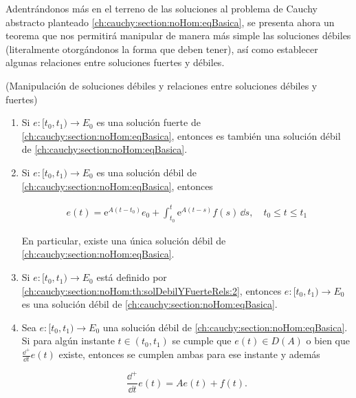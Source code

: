 Adentrándonos más en el terreno de las soluciones al problema de Cauchy abstracto planteado \eqref{ch:cauchy:section:noHom:eqBasica}, se presenta ahora un teorema que nos permitirá manipular de manera más simple las soluciones débiles (literalmente otorgándonos la forma que deben tener), así como establecer algunas relaciones entre soluciones fuertes y débiles.\\

\begin{Teorema}{(Manipulación de soluciones débiles y relaciones entre soluciones débiles y fuertes)}
    \label{ch:cauchy:section:noHom:th:solDebilYFuerteRels}

    \begin{enumerate}
        \item Si $e : [t_0, t_1) \rightarrow E_0$ es una solución fuerte de \eqref{ch:cauchy:section:noHom:eqBasica}, entonces es también una solución débil de \eqref{ch:cauchy:section:noHom:eqBasica}.

        \item Si $e : [t_0, t_1) \rightarrow E_0$ es una solución débil de \eqref{ch:cauchy:section:noHom:eqBasica}, entonces

        \begin{align}
            \label{ch:cauchy:section:noHom:th:solDebilYFuerteRels:2}
            e(t) = \mathrm{e}^{A(t-t_0)}e_0 + \int_{t_0}^{t}\mathrm{e}^{A(t-s)}f(s) \, \dd s, \quad t_0 \leq t \leq t_1
        \end{align}

        En particular, existe una única solución débil de \eqref{ch:cauchy:section:noHom:eqBasica}.

        \item Si $e : [t_0, t_1) \rightarrow E_0$ está definido por \eqref{ch:cauchy:section:noHom:th:solDebilYFuerteRels:2}, entonces $e : [t_0, t_1) \rightarrow E_0$ es una solución débil de \eqref{ch:cauchy:section:noHom:eqBasica}.

        \item Sea $e : [t_0, t_1) \rightarrow E_0$ una solución débil de \eqref{ch:cauchy:section:noHom:eqBasica}. Si para algún instante $t \in (t_0, t_1)$ se cumple que $e(t) \in D(A)$ o bien que $\displaystyle\frac{\dd^+}{\dd t}e(t)$ existe, entonces se cumplen ambas para ese instante y además

        \[\frac{\dd^+}{\dd t}e(t) = Ae(t) + f(t).\]
    \end{enumerate}
\end{Teorema}

